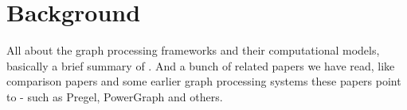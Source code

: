 \section{Background}
\label{sec:background}

All about the graph processing frameworks and their computational models, basically 
a brief summary of \cite{Heidari:2018:SGP:3212709.3199523}. And a bunch of related 
papers we have read, like comparison papers \cite{Guo:2014:WGP:2650283.2650530,
Ammar:2018:EAD:3231751.3242935} and some earlier graph processing systems these papers 
point to - such as Pregel\cite{Malewicz:2010:PSL:1807167.1807184}, PowerGraph
\cite{Gonzalez:2012:PDG:2387880.2387883} and others.




